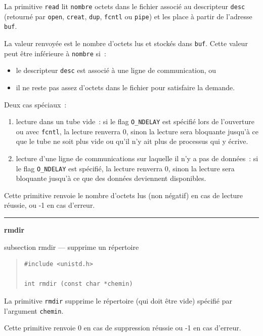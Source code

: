 \documentclass [twoside] {report}
\newcommand {\primitive} [1]
    {
	\phantomsection
	{\large \textbf {#1}}
	\addcontentsline {toc} {subsection} {#1}
    }
\newcommand {\separation}
    {
	\vspace {5mm}
	\nopagebreak
	\hrule
    }
\begin{document}
La primitive \texttt {read} lit \texttt {nombre} octets dans
le fichier associé au descripteur \texttt {desc}
(retourné par \texttt {open}, \texttt {creat}, \texttt {dup}, \texttt {fcntl}
ou \texttt {pipe}) et les place à partir de l'adresse
\texttt {buf}.

La valeur renvoyée est le nombre d'octets lus et
stockés dans \texttt {buf}. Cette valeur peut être
inférieure à \texttt {nombre} si~:
\begin {itemize}
    \item le descripteur \texttt {desc} est associé à une ligne
	de communication, ou
    \item il ne reste pas assez d'octets dans le fichier
	pour satisfaire la demande.
\end {itemize}

Deux cas spéciaux~:

\begin {enumerate}
    \item lecture dans un tube vide~: si le flag \texttt {O\_NDELAY}
	est spécifié lors de l'ouverture ou avec \texttt {fcntl},
	la lecture renverra 0, sinon la lecture
	sera bloquante jusqu'à ce que le tube ne soit plus
	vide ou qu'il n'y ait plus de processus qui y écrive.
    \item lecture d'une ligne de communications sur
	laquelle il n'y a pas de données~: si le flag \texttt {O\_NDELAY}
	est spécifié, la lecture renverra 0, sinon la lecture
	sera bloquante jusqu'à ce que des données
	deviennent disponibles.
\end {enumerate}

Cette primitive renvoie le nombre d'octets lus
(non négatif) en cas de lecture
réussie, ou -1 en cas d'erreur.




\separation
\primitive {rmdir} --- supprime un répertoire

\begin {quote}
\begin {verbatim}
#include <unistd.h>

int rmdir (const char *chemin)
\end{verbatim}
\end {quote}

La primitive \texttt {rmdir} supprime le répertoire (qui doit être vide)
spécifié par l'argument \texttt {chemin}.

Cette primitive renvoie 0 en cas de suppression réussie
ou -1 en cas d'erreur.
\end{document}
